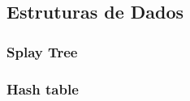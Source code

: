 
\subsection{Estruturas de Dados}
\label{sec:estruturas}

\subsubsection{Splay Tree}
\label{sec:splay}

\subsubsection{Hash table}
\label{sec:hash}

